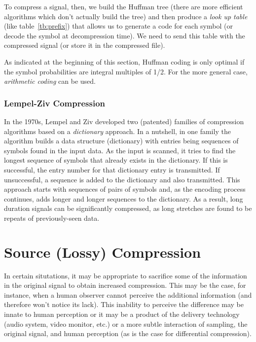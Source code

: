 To compress a signal, then, we build the Huffman tree (there
are more efficient algorithms which don't actually build the tree) and
then produce a \emph{look up table} (like table~\ref{tb:prefix}) that
allows us to generate a code for each symbol (or decode the symbol at
decompression time). We need to send this table with the compressed
signal (or store it in the compressed file).

As indicated at the beginning of this section, Huffman coding is only
optimal if the symbol probabilities are integral multiples of 1/2. For
the more general case, \emph{arithmetic coding} can be used.

\subsubsection{Lempel-Ziv Compression}

In the 1970s, Lempel and Ziv developed two (patented) families of
compression algorithms based on a \emph{dictionary} approach. In a
nutshell, in one family the algorithm builds a data structure
(dictionary) with entries being sequences of symbols found in the
input data. As the input is scanned, it tries to find the longest
sequence of symbols that already exists in the dictionary.  If this is
successful, the entry number for that dictionary entry is
transmitted.  If unsuccessful, a sequence is added to the dictionary
and also transmitted. This approach starts with sequences of pairs of
symbols and, as the encoding process continues, adds longer and longer
sequences to the dictionary. As a result, long duration signals can be
significantly compressed, as long stretches are found to be repeats of
previously-seen data.

\section{Source (Lossy) Compression}

In certain situtations, it may be appropriate to sacrifice some of the
information in the original signal to obtain increased compression.
This may be the case, for instance, when a human observer cannot
perceive the additional information (and therefore won't notice its
lack).  This inability to perceive the difference may be innate to
human perception or it may be a product of the delivery technology
(audio system, video monitor, etc.) or a more subtle interaction of
sampling, the original signal, and human perception (as is the case
for differential compression).

